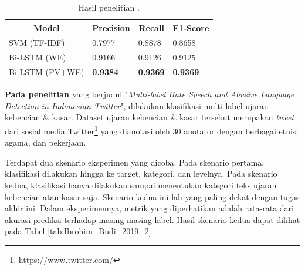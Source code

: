 \begin{table}[!h]
    \centering
    \caption{Hasil penelitian \parencite{CrisdayantiPurwarianti2019}.}
    \begin{tabular}{|l|l|l|l|}
    \hline
    \multicolumn{1}{|c|}{\textbf{Model}} & \multicolumn{1}{c|}{\textbf{Precision}} & \multicolumn{1}{c|}{\textbf{Recall}} & \textbf{F1-Score} \\ \hline
    SVM (TF-IDF)                         & 0.7977                                  & 0.8878                               & 0.8658            \\ \hline
    Bi-LSTM (WE)                         & 0.9166                                  & 0.9126                               & 0.9125            \\ \hline
    Bi-LSTM (PV+WE)                      & \textbf{0.9384}                         & \textbf{0.9369}                      & \textbf{0.9369}   \\ \hline
    \end{tabular}
    \label{tab:CrisdayantiPurwarianti2019}
\end{table}

\textbf{Pada penelitian \parencite{Ibrohim_Budi_2019}} yang berjudul "\textit{Multi-label Hate Speech and Abusive Language Detection in Indonesian Twitter}", dilakukan klasifikasi multi-label ujaran kebencian \& kasar. Dataset ujaran kebencian \& kasar tersebut merupakan \textit{tweet} dari sosial media Twitter\footnote{\url{https://www.twitter.com/}} yang dianotasi oleh 30 anotator dengan berbagai etnis, agama, dan pekerjaan. 

Terdapat dua skenario eksperimen yang dicoba. Pada skenario pertama, klasifikasi dilakukan hingga ke target, kategori, dan levelnya. Pada skenario kedua, klasifikasi hanya dilakukan sampai menentukan kategori teks ujaran kebencian atau kasar saja. Skenario kedua ini lah yang paling dekat dengan tugas akhir ini. Dalam eksperimennya, metrik yang diperhatikan adalah rata-rata dari akurasi prediksi terhadap masing-masing label. Hasil skenario kedua dapat dilihat pada Tabel \ref{tab:Ibrohim_Budi_2019_2}

